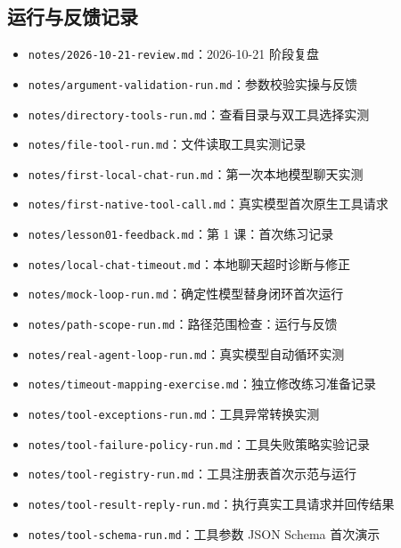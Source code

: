\documentclass[UTF8,zihao=-4,fontset=fandol]{ctexart}
\begin{document}
\subsection{运行与反馈记录}
\begin{itemize}
\item \nolinkurl{notes/2026-10-21-review.md}：2026-10-21 阶段复盘
\item \nolinkurl{notes/argument-validation-run.md}：参数校验实操与反馈
\item \nolinkurl{notes/directory-tools-run.md}：查看目录与双工具选择实测
\item \nolinkurl{notes/file-tool-run.md}：文件读取工具实测记录
\item \nolinkurl{notes/first-local-chat-run.md}：第一次本地模型聊天实测
\item \nolinkurl{notes/first-native-tool-call.md}：真实模型首次原生工具请求
\item \nolinkurl{notes/lesson01-feedback.md}：第 1 课：首次练习记录
\item \nolinkurl{notes/local-chat-timeout.md}：本地聊天超时诊断与修正
\item \nolinkurl{notes/mock-loop-run.md}：确定性模型替身闭环首次运行
\item \nolinkurl{notes/path-scope-run.md}：路径范围检查：运行与反馈
\item \nolinkurl{notes/real-agent-loop-run.md}：真实模型自动循环实测
\item \nolinkurl{notes/timeout-mapping-exercise.md}：独立修改练习准备记录
\item \nolinkurl{notes/tool-exceptions-run.md}：工具异常转换实测
\item \nolinkurl{notes/tool-failure-policy-run.md}：工具失败策略实验记录
\item \nolinkurl{notes/tool-registry-run.md}：工具注册表首次示范与运行
\item \nolinkurl{notes/tool-result-reply-run.md}：执行真实工具请求并回传结果
\item \nolinkurl{notes/tool-schema-run.md}：工具参数 JSON Schema 首次演示
\end{itemize}
\end{document}
